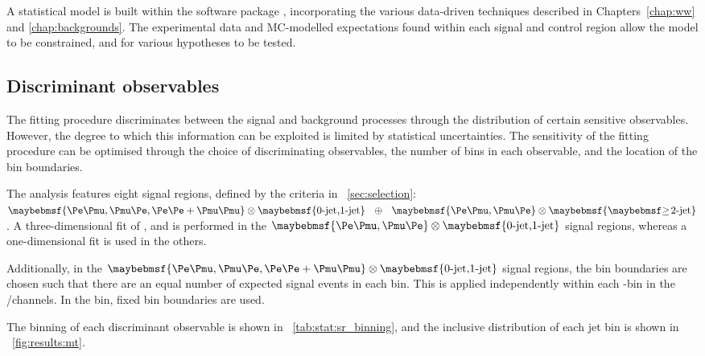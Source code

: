 
A statistical model is built within the \histfactory software package \cite{HistFactory}, 
incorporating the various data-driven techniques described in Chapters~\ref{chap:ww} and 
\ref{chap:backgrounds}. The experimental data and MC-modelled expectations found within each 
signal and control region allow the model to be constrained, and for various hypotheses to 
be tested.



\subsection{Discriminant observables}
\label{sec:stat:sr_binning}

The fitting procedure discriminates between the signal and background processes through the 
distribution of certain sensitive observables. However, the degree to which this information 
can be exploited is limited by statistical uncertainties. The sensitivity of the fitting 
procedure can be optimised through the choice of discriminating observables, the number of 
bins in each observable, and the location of the bin boundaries.

The analysis features eight signal regions, defined by the criteria in 
\Section~\ref{sec:selection}: $\braces{\emch,\mech,\eech{}+\mmch} \otimes 
\braces{\text{0-jet,1-jet}}~~\oplus~~\braces{\emch,\mech} \otimes \braces{\twojet}$.
A three-dimensional fit of \mt, \ptsubleadlep and \mll is performed in the 
$\braces{\emch,\mech} \otimes \braces{\text{0-jet,1-jet}}$ signal regions, whereas a 
one-dimensional \mt fit is used in the others.

Additionally, in the $\braces{\emch,\mech,\eech{}+\mmch} \otimes \braces{\text{0-jet,1-jet}}$
signal regions, the \mt bin boundaries are chosen such that there are an equal number of 
expected signal events in each bin. This is applied independently within each 
\ptsubleadlep-\mll bin in the \emch/\mech channels. In the \twojet bin, fixed \mt bin 
boundaries are used.

The binning of each discriminant observable is shown in \Table~\ref{tab:stat:sr_binning}, 
and the inclusive \mt distribution of each jet bin is shown in \Figure~\ref{fig:results:mt}.

